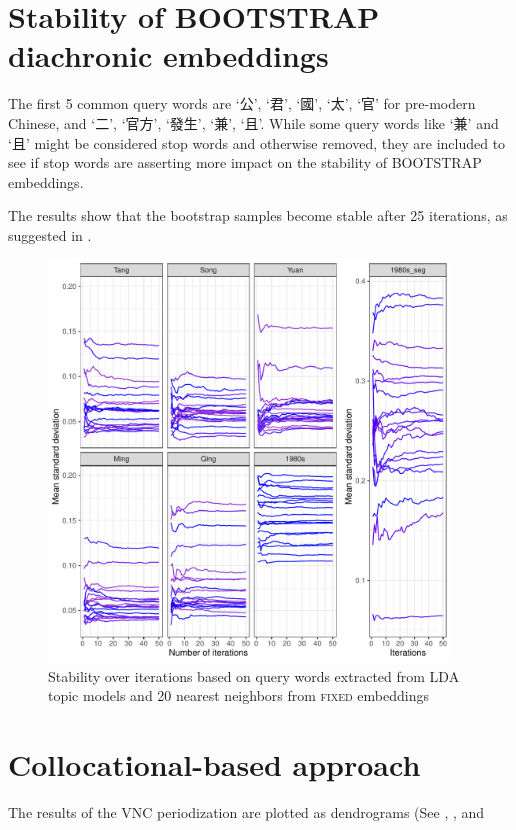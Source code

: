 \section{Stability of \textsc{BOOTSTRAP} diachronic embeddings}

The first 5 common query words are `公', `君', `國', `太', `官' for pre-modern Chinese, and `二', `官方', `發生', `兼', `且'. While some query words like `兼' and `且' might be considered stop words and otherwise removed, they are included to see if stop words are asserting more impact on the stability of \textsc{BOOTSTRAP} embeddings.

The results show that the bootstrap samples become stable after 25 iterations, as suggested in \textcite{antoniak2018evaluating}. 

\begin{figure}[H]
  \centering
  \includegraphics[width=0.95\textwidth,keepaspectratio]{figures/stability_plot_mean_std}
  \caption{Stability over iterations based on query words extracted from LDA topic models and 20 nearest neighbors from \textsc{fixed} embeddings}
  \end{figure}

\section{Collocational-based approach}
The results of the VNC periodization are plotted as dendrograms (See , , and %

